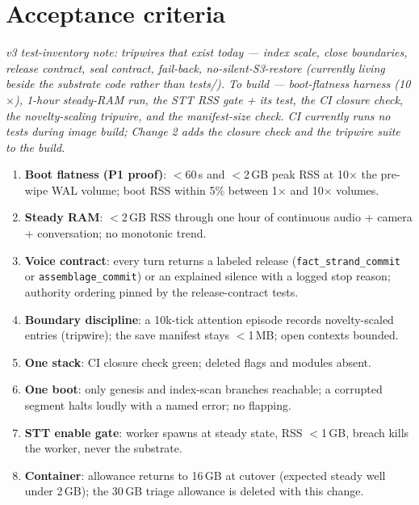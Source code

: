 \documentclass[11pt]{article}
\begin{document}
\section{Acceptance criteria}\label{sec:accept}

\emph{v3 test-inventory note: tripwires that exist today — index scale,
close boundaries, release contract, seal contract, fail-back,
no-silent-S3-restore (currently living beside the substrate code rather
than tests/). To build — boot-flatness harness (10$\times$), 1-hour
steady-RAM run, the STT RSS gate + its test, the CI closure check, the
novelty-scaling tripwire, and the manifest-size check. CI currently runs
no tests during image build; Change 2 adds the closure check and the
tripwire suite to the build.}

\begin{enumerate}[nosep]
  \item \textbf{Boot flatness (P1 proof)}: $<$60\,s and $<$2\,GB peak RSS
        at 10$\times$ the pre-wipe WAL volume; boot RSS within 5\% between
        1$\times$ and 10$\times$ volumes.
  \item \textbf{Steady RAM}: $<$2\,GB RSS through one hour of continuous
        audio + camera + conversation; no monotonic trend.
  \item \textbf{Voice contract}: every turn returns a labeled release
        (\texttt{fact\_strand\_commit} or \texttt{assemblage\_commit}) or
        an explained silence with a logged stop reason; authority ordering
        pinned by the release-contract tests.
  \item \textbf{Boundary discipline}: a 10k-tick attention episode records
        novelty-scaled entries (tripwire); the save manifest stays
        $<$1\,MB; open contexts bounded.
  \item \textbf{One stack}: CI closure check green; deleted flags and
        modules absent.
  \item \textbf{One boot}: only genesis and index-scan branches reachable;
        a corrupted segment halts loudly with a named error; no flapping.
  \item \textbf{STT enable gate}: worker spawns at steady state, RSS
        $<$1\,GB, breach kills the worker, never the substrate.
  \item \textbf{Container}: allowance returns to 16\,GB at cutover
        (expected steady well under 2\,GB); the 30\,GB triage allowance is
        deleted with this change.
\end{enumerate}
\end{document}
